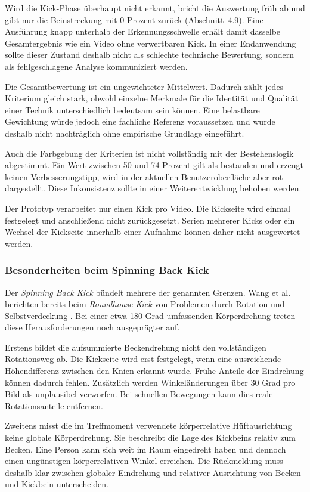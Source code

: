 \documentclass[intern]{cgMA}
\begin{document}
Wird die Kick-Phase überhaupt nicht erkannt, bricht die Auswertung früh ab und gibt nur die Beinstreckung mit 0 Prozent zurück (Abschnitt~4.9). Eine Ausführung knapp unterhalb der Erkennungsschwelle erhält damit dasselbe Gesamtergebnis wie ein Video ohne verwertbaren Kick. In einer Endanwendung sollte dieser Zustand deshalb nicht als schlechte technische Bewertung, sondern als fehlgeschlagene Analyse kommuniziert werden.

Die Gesamtbewertung ist ein ungewichteter Mittelwert. Dadurch zählt jedes Kriterium gleich stark, obwohl einzelne Merkmale für die Identität und Qualität einer Technik unterschiedlich bedeutsam sein können. Eine belastbare Gewichtung würde jedoch eine fachliche Referenz voraussetzen und wurde deshalb nicht nachträglich ohne empirische Grundlage eingeführt.

Auch die Farbgebung der Kriterien ist nicht vollständig mit der Bestehenslogik abgestimmt. Ein Wert zwischen 50 und 74 Prozent gilt als bestanden und erzeugt keinen Verbesserungstipp, wird in der aktuellen Benutzeroberfläche aber rot dargestellt. Diese Inkonsistenz sollte in einer Weiterentwicklung behoben werden.

Der Prototyp verarbeitet nur einen Kick pro Video. Die Kickseite wird einmal festgelegt und anschließend nicht zurückgesetzt. Serien mehrerer Kicks oder ein Wechsel der Kickseite innerhalb einer Aufnahme können daher nicht ausgewertet werden.

\subsubsection{Besonderheiten beim Spinning Back Kick}
\label{sec:grenzen_dwit}
Der \textit{Spinning Back Kick} bündelt mehrere der genannten Grenzen. Wang et al. berichten bereits beim \textit{Roundhouse Kick} von Problemen durch Rotation und Selbstverdeckung \cite{Wang2026}. Bei einer etwa 180 Grad umfassenden Körperdrehung treten diese Herausforderungen noch ausgeprägter auf.

Erstens bildet die aufsummierte Beckendrehung nicht den vollständigen Rotationsweg ab. Die Kickseite wird erst festgelegt, wenn eine ausreichende Höhendifferenz zwischen den Knien erkannt wurde. Frühe Anteile der Eindrehung können dadurch fehlen. Zusätzlich werden Winkeländerungen über 30 Grad pro Bild als unplausibel verworfen. Bei schnellen Bewegungen kann dies reale Rotationsanteile entfernen.

Zweitens misst die im Treffmoment verwendete körperrelative Hüftausrichtung keine globale Körperdrehung. Sie beschreibt die Lage des Kickbeins relativ zum Becken. Eine Person kann sich weit im Raum eingedreht haben und dennoch einen ungünstigen körperrelativen Winkel erreichen. Die Rückmeldung muss deshalb klar zwischen globaler Eindrehung und relativer Ausrichtung von Becken und Kickbein unterscheiden.
\end{document}
